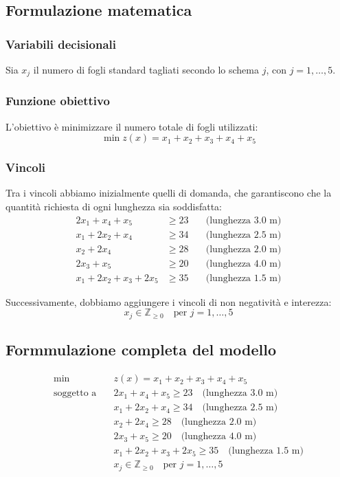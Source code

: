 \subsection{Formulazione matematica}
\subsubsection{Variabili decisionali}
Sia $x_j$ il numero di fogli standard tagliati secondo lo schema $j$, con $j = 1, \ldots, 5$.


\subsubsection{Funzione obiettivo}
L'obiettivo è minimizzare il numero totale di fogli utilizzati:
\[
\min z(x) = x_1 + x_2 + x_3 + x_4 + x_5
\]


\subsubsection{Vincoli}
Tra i vincoli abbiamo inizialmente quelli di domanda, che garantiscono che la quantità richiesta di ogni lunghezza sia soddisfatta:
\[
\begin{aligned}
2x_1 + x_4 + x_5 &\geq 23 \quad &\text{(lunghezza 3.0 m)} \\
x_1 + 2x_2 + x_4 &\geq 34 \quad &\text{(lunghezza 2.5 m)} \\
x_2 + 2x_4 &\geq 28 \quad &\text{(lunghezza 2.0 m)} \\
2x_3 + x_5 &\geq 20 \quad &\text{(lunghezza 4.0 m)} \\
x_1 + 2x_2 + x_3 + 2x_5 &\geq 35 \quad &\text{(lunghezza 1.5 m)}
\end{aligned}
\]

Successivamente, dobbiamo aggiungere i vincoli di non negatività e interezza:
\[
x_j \in \mathbb{Z}_{\geq 0} \quad \text{per } j = 1, \dots, 5
\]

\subsection{Formmulazione completa del modello}
\[
\begin{aligned}
\min \quad & z(x) = x_1 + x_2 + x_3 + x_4 + x_5 \\
\text{soggetto a} \quad & 2x_1 + x_4 + x_5 \geq 23 \quad \text{(lunghezza 3.0 m)} \\
& x_1 + 2x_2 + x_4 \geq 34 \quad \text{(lunghezza 2.5 m)} \\
& x_2 + 2x_4 \geq 28 \quad \text{(lunghezza 2.0 m)} \\
& 2x_3 + x_5 \geq 20 \quad \text{(lunghezza 4.0 m)} \\
& x_1 + 2x_2 + x_3 + 2x_5 \geq 35 \quad \text{(lunghezza 1.5 m)} \\
& x_j \in \mathbb{Z}_{\geq 0} \quad \text{per } j = 1, \dots, 5
\end{aligned}
\]

